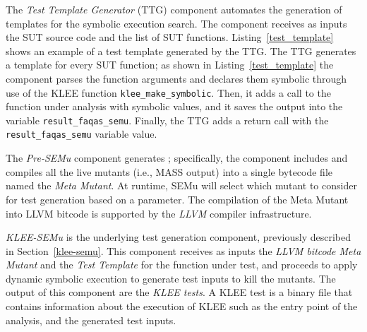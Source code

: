 


The \emph{Test Template Generator} (TTG) component automates the generation of templates for the symbolic execution search. The component receives as inputs the SUT source code and the list of SUT functions. 
Listing~\ref{test_template} shows an example of a test template generated by the TTG. The TTG generates a template for every SUT function; as shown in Listing~\ref{test_template} the component parses the function arguments and declares them symbolic through use of the KLEE function \texttt{klee\_make\_symbolic}. Then, it adds a call to the function under analysis with symbolic values, and it saves the output into the variable \texttt{result\_faqas\_semu}. Finally, the TTG adds a return call with the \texttt{result\_faqas\_semu} variable value.

The \emph{Pre-SEMu} component generates ; specifically, the component includes and compiles all the live mutants (i.e., MASS output) into a single bytecode file named the \emph{Meta Mutant}. At runtime, SEMu will select which mutant to consider for test generation based on a parameter. The compilation of the Meta Mutant into LLVM bitcode is supported by the \emph{LLVM} compiler infrastructure. 



\emph{KLEE-SEMu} is the underlying test generation component, previously described in Section~\ref{klee-semu}. This component receives as inputs the \emph{LLVM bitcode Meta Mutant} and the \emph{Test Template} for the function under test, and proceeds to apply dynamic symbolic execution to generate test inputs to kill the mutants. The output of this component are the \emph{KLEE tests}.
A KLEE test is a binary file that contains information about the execution of KLEE such as the entry point of the analysis, and the generated test inputs.

